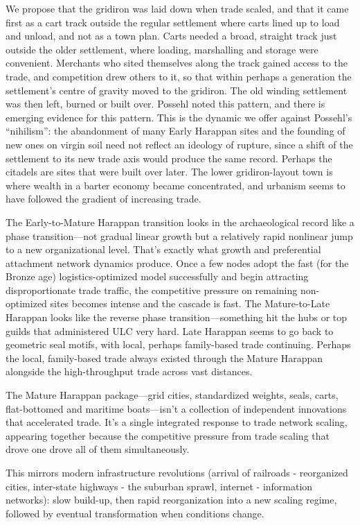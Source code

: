 \documentclass[12pt]{article}
\begin{document}
We propose that the gridiron was laid down when trade scaled, and that it came
first as a cart track outside the regular settlement where carts lined up to load
and unload, and not as a town plan. Carts needed a broad, straight track
just outside the older settlement, where loading, marshalling and storage were
convenient. Merchants who sited themselves along the track gained access to the
trade, and competition drew others to it, so that within perhaps a generation the
settlement's centre of gravity moved to the gridiron. The old winding settlement
was then left, burned or built over.  Possehl noted this pattern, and there is
emerging evidence for this pattern. This is the dynamic we offer against Possehl's
``nihilism'': the abandonment of many Early Harappan sites and the founding of new
ones on virgin soil need not reflect an ideology of rupture, since a shift of the
settlement to its new trade axis would produce the same record. Perhaps the citadels
are sites that were built over later. The lower gridiron-layout town is where wealth
in a barter economy became concentrated, and urbanism seems to have followed the
gradient of increasing trade.

The Early-to-Mature Harappan transition looks in the archaeological record like a
phase transition---not gradual linear growth but a relatively rapid nonlinear jump
to a new organizational level. That's exactly what growth and preferential attachment
network dynamics produce. Once a few nodes adopt the fast (for the Bronze age)
logistics-optimized model successfully and begin attracting disproportionate trade
traffic, the competitive pressure on remaining non-optimized sites becomes intense
and the cascade is fast.  The Mature-to-Late Harappan looks like the reverse phase
transition---something hit the hubs or top guilds that administered ULC very hard.
Late Harappan seems to go back to geometric seal motifs, with local, perhaps
family-based trade continuing. Perhaps the local, family-based trade always existed
through the Mature Harappan alongside the high-throughput trade across vast distances.

The Mature Harappan package---grid cities, standardized weights, seals, carts,
flat-bottomed and maritime boats---isn't a collection of independent innovations
that accelerated trade. It's a single integrated response to trade network scaling,
appearing together because the competitive pressure from trade scaling that drove
one drove all of them simultaneously.

This mirrors modern infrastructure revolutions (arrival of railroads - reorganized
cities, inter-state highways - the suburban sprawl, internet - information
networks): slow build-up, then rapid reorganization into a new scaling regime,
followed by eventual transformation when conditions change.
\end{document}
